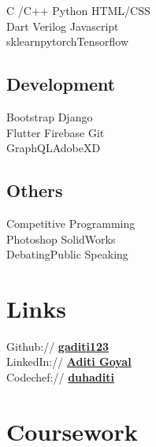 \documentclass{deedy-resume-openfont}
\begin{document}
\begin{minipage}[t]{0.33\textwidth}
\textbullet{}C /C++\textbullet{} Python \textbullet{} HTML/CSS \\\textbullet{} Dart \textbullet{} Verilog \textbullet{}Javascript\\
\textbullet{} sklearn\textbullet{}pytorch\textbullet{}Tensorflow\\
\sectionsep
\subsection{Development}
 \textbullet{}Bootstrap \textbullet{}Django\\
 \textbullet{}Flutter \textbullet{}Firebase
 \textbullet{}Git\\\textbullet{} GraphQL\textbullet{}AdobeXD\\
\sectionsep
\subsection{Others}
 \textbullet{}Competitive Programming \\\textbullet{}Photoshop\textbullet{} SolidWorks\\
 \textbullet{}Debating\textbullet{}Public Speaking\\
\sectionsep


\section{Links} 
Github:// \href{https://github.com/gaditi123}{\bf gaditi123 }\href{https://github.com/gaditi123}{\faExternalLink} \\
LinkedIn://  \href{https://www.linkedin.com/in/aditi-goyal-21b834196/}{\bf Aditi Goyal }\href{https://www.linkedin.com/in/aditi-goyal-21b834196/}{\faExternalLink} \\
Codechef://  \href{https://www.codechef.com/users/duhaditi}{\bf duhaditi }\href{https://www.codechef.com/users/duhaditi}{\faExternalLink} \\
\sectionsep


\section{Coursework}


\end{minipage}
\end{document}
